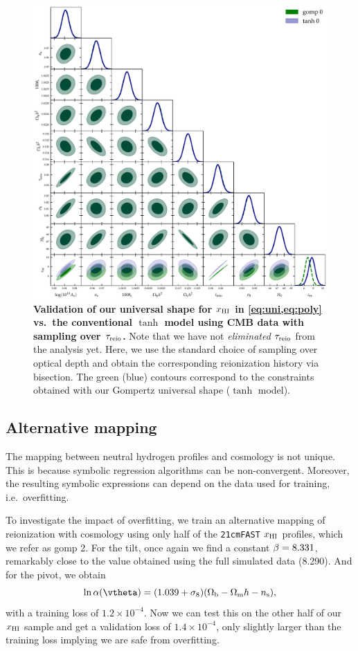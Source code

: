 \begin{figure}[tb]
\centering
\includegraphics[width=\linewidth]{figs/gomp_tanh_triangle_tau.pdf}
\caption{\textbf{Validation of our universal shape for $x_{\mathrm{HI}}$ in \cref{eq:uni,eq:poly} vs.\ the
conventional $\tanh$ model using CMB data with sampling over $\tau_{\mathrm{reio}}$.}
Note that we have not \emph{eliminated} $\tau_{\mathrm{reio}}$ from the analysis
yet.
Here, we use the standard choice of sampling over optical depth and
obtain the corresponding reionization history via bisection.
The green (blue) contours correspond to the constraints obtained with
our Gompertz universal shape ($\tanh$ model).}
\label{fig:tg}
\end{figure}

\subsection*{Alternative mapping}
\label{ssec:0226}

The mapping between neutral hydrogen profiles and cosmology is not
unique.
This is because symbolic regression algorithms can be non-convergent.
Moreover, the resulting symbolic expressions can depend on the data used
for training, i.e.\ overfitting.

To investigate the impact of overfitting, we train an alternative
mapping of reionization with cosmology using only half of the
\texttt{21cmFAST} $x_{\mathrm{HI}}$ profiles, which we refer as gomp 2.
For the tilt, once again we find a constant $\beta = 8.331$, remarkably
close to the value obtained using the full simulated data (8.290).
And for the pivot, we obtain
%
\begin{equation}
\label{eq:SR0226}
\ln\ap(\vtheta) = (1.039 + \sigma_8) (\Omegab - \Omegam h - \ns),
\end{equation}
%
with a training loss of $1.2 \times 10^{-4}$.
Now we can test this on the other half of our $x_{\mathrm{HI}}$ sample and get a
validation loss of $1.4 \times 10^{-4}$, only slightly larger than the
training loss implying we are safe from overfitting.

